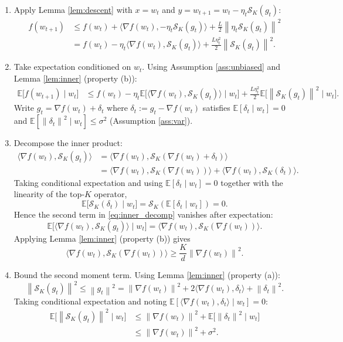 \documentclass{article}
\newcommand{\E}{\mathbb{E}}
\newcommand{\norm}[1]{\left\|#1\right\|}
\newcommand{\ip}[2]{\langle #1,#2\rangle}
\newcommand{\topk}[1]{\mathcal{S}_K(#1)}
\begin{document}
\begin{enumerate}
\item[Step 1.] Apply Lemma \ref{lem:descent} with \(x=w_t\) and \(y=w_{t+1}=w_t-\eta_t\topk{g_t}\):
\begin{align}
f(w_{t+1})
&\le f(w_t)+\ip{\nabla f(w_t)}{-\eta_t\topk{g_t}}+\frac{L}{2}\norm{\eta_t\topk{g_t}}^2 \nonumber\\
&= f(w_t)-\eta_t\ip{\nabla f(w_t)}{\topk{g_t}}+\frac{L\eta_t^{2}}{2}\norm{\topk{g_t}}^2 .
\label{eq:descent1}
\end{align}
\item[Step 2.] Take expectation conditioned on \(w_t\).  Using Assumption \ref{ass:unbiased} and Lemma \ref{lem:inner} (property (b)):
\begin{align}
\E\bigl[f(w_{t+1})\mid w_t\bigr]
&\le f(w_t)-\eta_t\E\bigl[\ip{\nabla f(w_t)}{\topk{g_t}}\mid w_t\bigr]
       +\frac{L\eta_t^{2}}{2}\E\bigl[\norm{\topk{g_t}}^2\mid w_t\bigr] .
\label{eq:condexp1}
\end{align}
Write \(g_t=\nabla f(w_t)+\delta_t\) where \(\delta_t:=g_t-\nabla f(w_t)\) satisfies \(\E[\delta_t\mid w_t]=0\) and \(\E[\norm{\delta_t}^2\mid w_t]\le\sigma^2\) (Assumption \ref{ass:var}).

\item[Step 3.] Decompose the inner product:
\begin{align}
\ip{\nabla f(w_t)}{\topk{g_t}}
&=\ip{\nabla f(w_t)}{\topk{\nabla f(w_t)+\delta_t}} \nonumber\\
&=\ip{\nabla f(w_t)}{\topk{\nabla f(w_t)}} 
  +\ip{\nabla f(w_t)}{\topk{\delta_t}} .
\label{eq:inner_decomp}
\end{align}
Taking conditional expectation and using \(\E[\delta_t\mid w_t]=0\) together with the linearity of the top‑\(K\) operator,
\[
\E\bigl[\topk{\delta_t}\mid w_t\bigr]=\topk{\E[\delta_t\mid w_t]}=0 .
\]
Hence the second term in \eqref{eq:inner_decomp} vanishes after expectation:
\begin{equation}
\E\bigl[\ip{\nabla f(w_t)}{\topk{g_t}}\mid w_t\bigr]
= \ip{\nabla f(w_t)}{\topk{\nabla f(w_t)}} .
\label{eq:inner_expect}
\end{equation}
Applying Lemma \ref{lem:inner} (property (b)) gives
\begin{equation}
\ip{\nabla f(w_t)}{\topk{\nabla f(w_t)}}\ge\frac{K}{d}\norm{\nabla f(w_t)}^2 .
\label{eq:inner_bound}
\end{equation}

\item[Step 4.] Bound the second moment term.  Using Lemma \ref{lem:inner} (property (a)):
\[
\norm{\topk{g_t}}^2\le \norm{g_t}^2
= \norm{\nabla f(w_t)}^2+2\ip{\nabla f(w_t)}{\delta_t}+\norm{\delta_t}^2 .
\]
Taking conditional expectation and noting \(\E[\ip{\nabla f(w_t)}{\delta_t}\mid w_t]=0\):
\begin{align}
\E\bigl[\norm{\topk{g_t}}^2\mid w_t\bigr]
&\le \norm{\nabla f(w_t)}^2+\E\bigl[\norm{\delta_t}^2\mid w_t\bigr] \nonumber\\
&\le \norm{\nabla f(w_t)}^2+\sigma^{2}.
\label{eq:norm_bound}
\end{align}


\end{enumerate}
\end{document}
